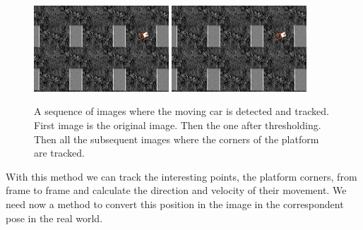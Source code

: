 \begin{figure}[!htbp]
  \vspace{1cm}
  {\includegraphics[width=0.45\textwidth]{img/18856_optical_flow.png}\label{fig:optical5}}
  \hfill
  {\includegraphics[width=0.45\textwidth]{img/18881_optical_flow.png}\label{fig:optical6}}
 
  \caption{A sequence of images where the moving car is detected and tracked. First image is the original image. Then the one after thresholding. Then all the subsequent images where the corners of the platform are tracked.}
  \label{fig:optical_folw_sequence}
\end{figure} 

With this method we can track the interesting points, the platform corners, from frame to frame and calculate the direction and velocity of their movement. We need now a method to convert this position in the image in the correspondent pose in the real world.

